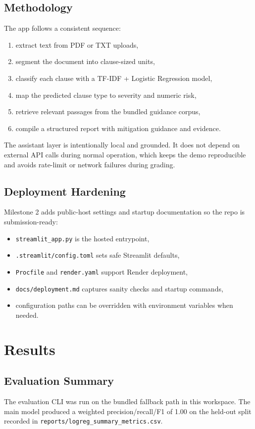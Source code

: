 \documentclass[11pt]{article}
\begin{document}
\subsection{Methodology}
The app follows a consistent sequence:
\begin{enumerate}
    \item extract text from PDF or TXT uploads,
    \item segment the document into clause-sized units,
    \item classify each clause with a TF-IDF + Logistic Regression model,
    \item map the predicted clause type to severity and numeric risk,
    \item retrieve relevant passages from the bundled guidance corpus,
    \item compile a structured report with mitigation guidance and evidence.
\end{enumerate}

The assistant layer is intentionally local and grounded. It does not depend on external API calls during normal operation, which keeps the demo reproducible and avoids rate-limit or network failures during grading.

\subsection{Deployment Hardening}
Milestone 2 adds public-host settings and startup documentation so the repo is submission-ready:
\begin{itemize}
    \item \texttt{streamlit_app.py} is the hosted entrypoint,
    \item \texttt{.streamlit/config.toml} sets safe Streamlit defaults,
    \item \texttt{Procfile} and \texttt{render.yaml} support Render deployment,
    \item \texttt{docs/deployment.md} captures sanity checks and startup commands,
    \item configuration paths can be overridden with environment variables when needed.
\end{itemize}

\section{Results}
\subsection{Evaluation Summary}
The evaluation CLI was run on the bundled fallback path in this workspace. The main model produced a weighted precision/recall/F1 of 1.00 on the held-out split recorded in \texttt{reports/logreg\_summary\_metrics.csv}.
\end{document}
